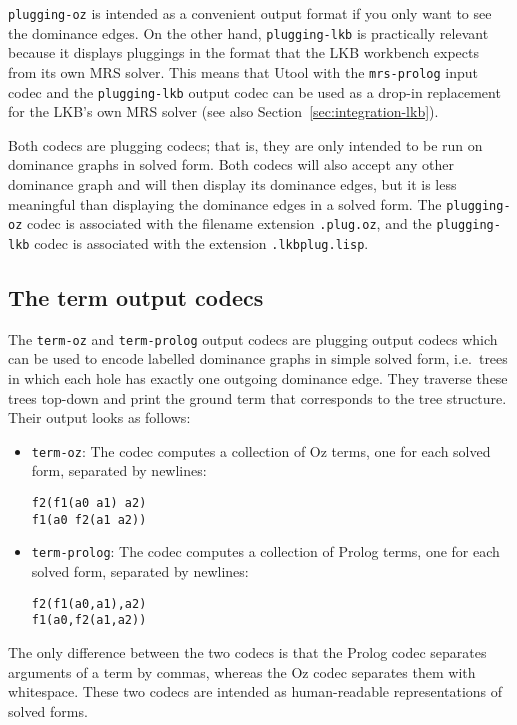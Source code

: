\verb?plugging-oz? is intended as a convenient output format if you
only want to see the dominance edges. On the other hand,
\verb?plugging-lkb? is practically relevant because it displays
pluggings in the format that the LKB workbench expects from its own
MRS solver. This means that Utool with the \verb?mrs-prolog? input
codec and the \verb?plugging-lkb? output codec can be used as a
drop-in replacement for the LKB's own MRS solver (see also
Section~\ref{sec:integration-lkb}).

Both codecs are plugging codecs; that is, they are only intended to be
run on dominance graphs in solved form. Both codecs will also accept
any other dominance graph and will then display its dominance edges,
but it is less meaningful than displaying the dominance edges in a
solved form. The \verb?plugging-oz? codec is associated with the
filename extension \verb?.plug.oz?, and the \verb?plugging-lkb? codec
is associated with the extension \verb?.lkbplug.lisp?.



\subsection{The term output codecs}

The \verb?term-oz? and \verb?term-prolog? output codecs are plugging
output codecs which can be used to encode labelled dominance graphs in
simple solved form, i.e.\ trees in which each hole has exactly one
outgoing dominance edge. They traverse these trees top-down and print
the ground term that corresponds to the tree structure. Their output
looks as follows:
\begin{itemize}
\item \verb?term-oz?: The codec computes a collection of Oz terms, one
  for each solved form, separated by newlines:
\begin{verbatim}
f2(f1(a0 a1) a2)
f1(a0 f2(a1 a2))
\end{verbatim}
\item \verb?term-prolog?: The codec computes a collection of Prolog
  terms, one for each solved form, separated by newlines:
\begin{verbatim}
f2(f1(a0,a1),a2)
f1(a0,f2(a1,a2))
\end{verbatim}
\end{itemize}

The only difference between the two codecs is that the Prolog codec
separates arguments of a term by commas, whereas the Oz codec
separates them with whitespace. These two codecs are intended as
human-readable representations of solved forms.

